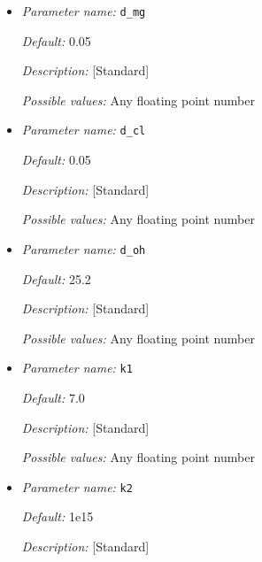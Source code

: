 \begin{itemize}

{\it Default:} 1.0

{\it Description:} [Advanced] 

{\it Possible values:} Any floating point number


\item {\it Parameter name:} {\tt d\_mg}
\label{parameters:d_mg}


{\it Default:} 0.05

{\it Description:} [Standard] 

{\it Possible values:} Any floating point number


\item {\it Parameter name:} {\tt d\_cl}
\label{parameters:d_cl}


{\it Default:} 0.05

{\it Description:} [Standard] 

{\it Possible values:} Any floating point number


\item {\it Parameter name:} {\tt d\_oh}
\label{parameters:d_oh}


{\it Default:} 25.2

{\it Description:} [Standard] 

{\it Possible values:} Any floating point number


\item {\it Parameter name:} {\tt k1}
\label{parameters:k1}


{\it Default:} 7.0

{\it Description:} [Standard] 

{\it Possible values:} Any floating point number


\item {\it Parameter name:} {\tt k2}
\label{parameters:k2}


{\it Default:} 1e15

{\it Description:} [Standard] 


\end{itemize}
